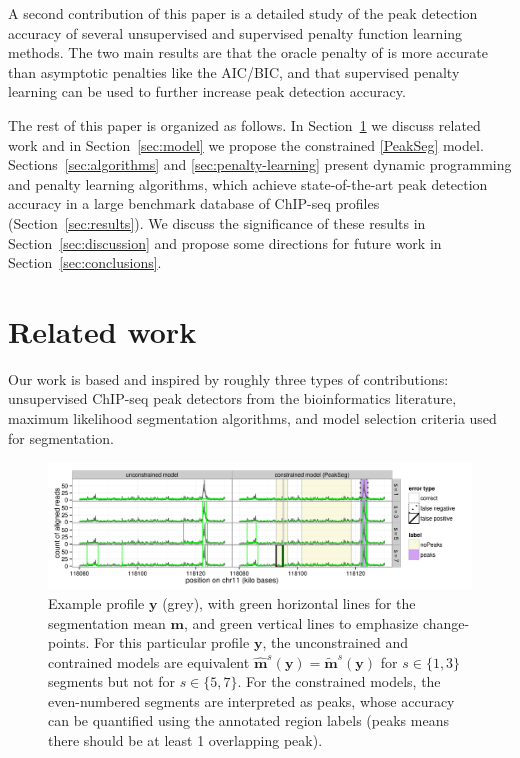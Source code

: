\documentclass{article}
\begin{document}
A second contribution of this paper is a detailed study of the peak
detection accuracy of several unsupervised and supervised penalty
function learning methods. The two main results are that the oracle
penalty of \citet{cleynen2013segmentation} is more accurate than
asymptotic penalties like the AIC/BIC, and that supervised penalty
learning can be used to further increase peak detection accuracy.

The rest of this paper is organized as follows. In
Section~\ref{sec:related} we discuss related work and in
Section~\ref{sec:model} we propose the constrained \ref{PeakSeg}
model. Sections~\ref{sec:algorithms} and \ref{sec:penalty-learning}
present dynamic programming and penalty learning algorithms, which
achieve state-of-the-art peak detection accuracy in a large benchmark
database of ChIP-seq profiles (Section~\ref{sec:results}). We discuss
the significance of these results in Section~\ref{sec:discussion} and
propose some directions for future work in
Section~\ref{sec:conclusions}.

\section{Related work}
\label{sec:related}

Our work is based and inspired by roughly three types of contributions:
unsupervised ChIP-seq peak detectors from the bioinformatics
literature, maximum likelihood segmentation algorithms, and model
selection criteria used for segmentation.

\begin{figure}[b!]
  \centering
  \includegraphics[width=\textwidth]{figure-Segmentor-PeakSeg}
  \vskip -0.5cm
  \caption{Example profile $\mathbf y$ (grey), with green horizontal
    lines for the segmentation mean $\mathbf m$, and green vertical
    lines to emphasize change-points. For this particular profile
    $\mathbf y$, the unconstrained and contrained models are
    equivalent $\mathbf{\hat m}^s(\mathbf y) = \mathbf{\tilde
      m}^s(\mathbf y)$ for $s\in\{1, 3\}$ segments but not for
    $s\in\{5, 7\}$. For the constrained models, the even-numbered
    segments are interpreted as peaks, whose accuracy can be
    quantified using the annotated region labels
    (\textcolor{peaks}{peaks} means there should be at least 1
    overlapping peak).}
  \label{fig:Segmentor-PeakSeg}
\end{figure}
\end{document}

